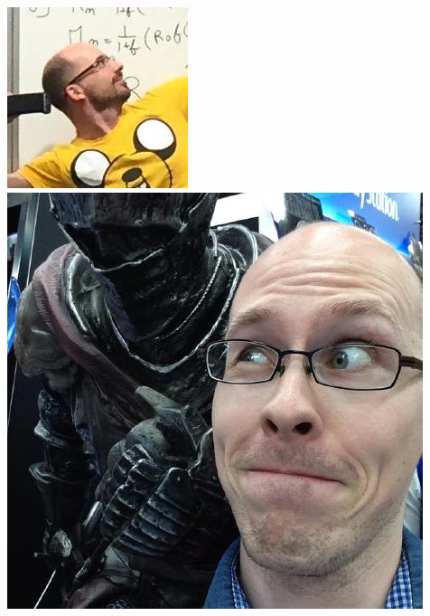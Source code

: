 \documentclass{beamer}
\begin{document}
\begin{frame}
\begin{columns}
\begin{columns}
\includegraphics[width=\textwidth]{Jeremie.jpg}
\includegraphics[width=\textwidth]{Lee.jpg}

\end{columns}
\end{columns}
\end{frame}
\end{document}
